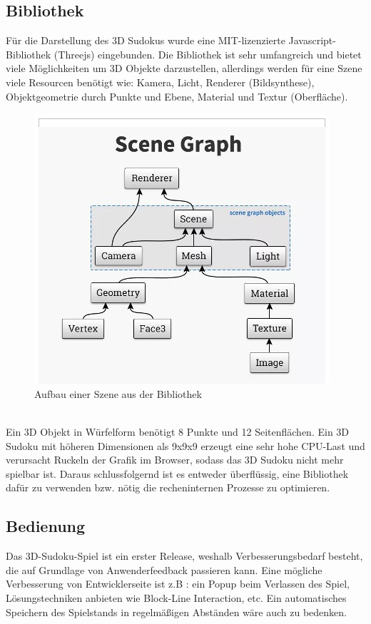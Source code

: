 \documentclass[a4paper,12pt]{scrreprt}
\begin{document}
	\subsection{Bibliothek}
	F\"ur die Darstellung des 3D Sudokus wurde eine MIT-lizenzierte Javascript-Bibliothek (Threejs) eingebunden.
	Die Bibliothek ist sehr umfangreich und bietet viele M\"oglichkeiten um 3D Objekte darzustellen,
	allerdings werden f\"ur eine Szene viele Resourcen ben\"otigt wie: Kamera, Licht, Renderer (Bildsynthese),
	Objektgeometrie durch Punkte und Ebene, Material und Textur (Oberfl\"ache). 
	\begin{figure}[h]
		\includegraphics[scale=0.7]{pictures/Sceneoverview}
		\caption{Aufbau einer Szene aus der Bibliothek}
	\end{figure}\smallskip \\
	Ein 3D Objekt in W\"urfelform ben\"otigt 8 Punkte und 12 Seitenfl\"achen.
	Ein 3D Sudoku mit h\"oheren Dimensionen als 9x9x9 erzeugt eine sehr hohe CPU-Last und verursacht Ruckeln
	der Grafik im Browser, sodass das 3D Sudoku nicht mehr spielbar ist.
	Daraus schlussfolgernd ist es entweder \"uberfl\"ussig, eine Bibliothek daf\"ur zu verwenden bzw. n\"otig
	die recheninternen Prozesse zu optimieren.
	\subsection{Bedienung}
	Das 3D-Sudoku-Spiel ist ein erster Release, weshalb Verbesserungsbedarf besteht, die auf Grundlage von
	Anwenderfeedback passieren kann. Eine m\"ogliche Verbesserung von Entwicklerseite ist z.B : ein Popup beim
	Verlassen des Spiel, L\"osungstechniken anbieten wie Block-Line Interaction, etc.
	Ein automatisches Speichern des Spielstands in regelm\"a{\ss}igen Abst\"anden w\"are auch zu bedenken.
	
\end{document}
